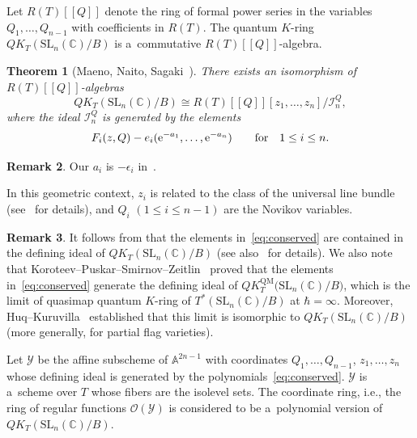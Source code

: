 \documentclass[pdftex]{sigma}
\numberwithin{equation}{section}
\newcommand{\C}{\mathbb{C}}
\newcommand{\Rep}{{R(T)}}
\newcommand{\SL}{\mathrm{SL}}
\newtheorem{Theorem}{Theorem}[section]
\theoremstyle{definition}
\newtheorem{Remark}[Theorem]{Remark}
\begin{document}
Let $R(T)[\![Q]\!]$ denote the
ring of formal power series in the variables $Q_1,\dots,Q_{n-1}$ with coefficients in $R(T)$.
The quantum $K$-ring $QK_T(\SL_n(\C)/B)$ is a~commutative $R(T)[\![Q]\!]$-algebra.
\begin{Theorem}[Maeno, Naito, Sagaki~\cite{MNS1}]\label{thm:MNS1}
There exists an isomorphism of $R(T)[\![Q]\!]$-algebras
\[
QK_T(\SL_n(\C)/B)\cong
\Rep[\![Q]\!][z_1,\dots,z_n]/\mathscr{I}_n^Q,
\]
where the ideal $\mathscr{I}_n^Q$ is generated by the elements
\begin{equation}\label{eq:conserved}
F_i(z,Q)-e_i({\rm e}^{-a_1},\dots,{\rm e}^{-a_n})\qquad \text{for}\quad 1\le i\le n. \end{equation}
\end{Theorem}
\begin{Remark}
Our $a_i$ is $-\epsilon_i$ in~\cite{MNS1}.
\end{Remark}In this geometric
context, $z_i$ is related to the class of
the universal line bundle (see~\cite{MNS1} for details),
and $Q_i$ $(1\le i\le n-1)$ are the Novikov variables.

\begin{Remark}\label{rem:KPSZ}
It follows from \cite[Corollary~2]{GL} that the elements in~\eqref{eq:conserved} are contained in the defining ideal of $QK_T(\SL_n(\C)/B)$ (see also~\cite{ACT, MNS1} for details).
We also note that Koroteev--Puskar--Smirnov--Zeitlin~\cite{KPSZ} proved that the elements in~\eqref{eq:conserved} generate the defining ideal of $
QK_T^{\mathrm{QM}}\bigl(\SL_n(\C)/B\bigr)$,
which is the limit of quasimap quantum $K$-ring of $T^*(\SL_n(\C)/B)$ at $\hbar = \infty$.
Moreover, Huq--Kuruvilla~\cite{HK} established that this limit is isomorphic to $QK_T(\SL_n(\C)/B)$ (more generally, for partial flag varieties).
\end{Remark}

Let $\mathscr{Y}$ be the affine subscheme
of $\mathbb{A}^{2n-1}$ with coordinates
$Q_1,\dots,Q_{n-1}$, $z_1,\dots,z_n$
whose defining ideal is generated by the polynomials~\eqref{eq:conserved}.
$\mathscr{Y}$ is a~scheme over $T$ whose fibers are the isolevel sets.
The coordinate ring, i.e., the ring of regular functions $\mathscr{O}(\mathscr{Y})$ is
considered to be a~polynomial version \smash{$QK_T^{\mathrm{pol}}(\SL_n(\C)/B)$} of $QK_T(\SL_n(\C)/B)$.
\end{document}

